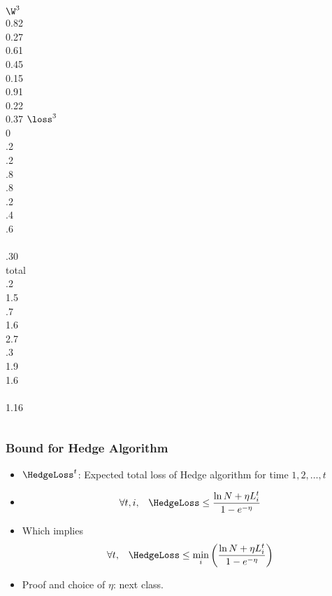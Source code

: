 \begin{frame}
\begin{columns}
\column[t]{1cm}
  $\W^3$ \\0.82\\ 0.27\\0.61\\0.45\\0.15\\ 0.91\\0.22 \\ 0.37 
\column[t]{1cm}
$\loss^3$ \\ 0 \\ .2 \\ .2  \\ .8 \\ .8 \\  .2 \\  .4  \\ .6 \\ ~ \\
\color<11>{red} .30 \\

\column[t]{2cm}
 total\\ .2 \\ 1.5 \\ .7  \\ 1.6 \\ 2.7 \\ .3 \\ 1.9  \\ 1.6 \\ ~ \\
 1.16 \\

\end{columns} 
\end{frame} 

\begin{frame}
\frametitle{Bound for Hedge Algorithm}
\begin{itemize}
\item
$\HedgeLoss^t$: Expected total loss of Hedge algorithm for time $1,2,\ldots,t$ 
\item
\[
\forall t,i, \;\;\;
\HedgeLoss \leq \frac{\ln N + \eta L_i^t}{1-e^{-\eta}}
\]
\item Which implies
\[
\forall t, \;\;\;
\HedgeLoss \leq \min_i \left( \frac{\ln N + \eta L_i^t}{1-e^{-\eta}} \right)
\]
\item
Proof and choice of $\eta$: next class.
\end{itemize}
\end{frame}

